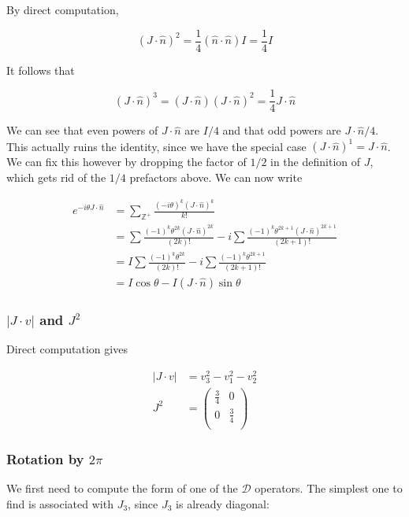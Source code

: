 \documentclass[12pt]{article}
\begin{document}
By direct computation,

\[ (J \cdot \hat{n})^2 = \frac{1}{4}(\hat{n}\cdot\hat{n})I = \frac{1}{4}I
\]

It follows that

\[ (J \cdot \hat{n})^3 = (J \cdot \hat{n})(J \cdot \hat{n})^2 = \frac{1}{4}J \cdot \hat{n}
\]

We can see that even powers of \(J\cdot\hat{n}\) are \(I/4\) and that odd powers are \(J\cdot\hat{n}/4\). This actually ruins the identity, since we have the special case \((J\cdot\hat{n})^1=J\cdot\hat{n}\). We can fix this however by dropping the factor of \(1/2\) in the definition of \(J\), which gets rid of the \(1/4\) prefactors above. We can now write

\begin{align*}
e^{-i\theta J \cdot \hat{n}} &= \sum_\mathbb{Z^+} \frac{(-i\theta)^k (J\cdot\hat{n})^k}{k!} \\
&= \sum \frac{(-1)^k\theta^{2k}(J\cdot\hat{n})^{2k}}{(2k)!} - i\sum \frac{(-1)^k\theta^{2k+1}( J\cdot\hat{n})^{2k+1}}{(2k+1)!} \\
&= I\sum \frac{(-1)^k\theta^{2k}}{(2k)!} - i\sum \frac{(-1)^k\theta^{2k+1}}{(2k+1)!} \\
&= I\cos\theta - I(J\cdot\hat{n})\sin\theta
\end{align*}

\subsubsection*{\(|J\cdot v|\) and \(J^2\)}

Direct computation gives

\begin{align*}
|J\cdot v| &= v_3^2 - v_1^2 - v_2^2 \\[6pt]
J^2 &= \left(
\begin{array}{cc}
 \frac{3}{4} & 0 \\
 0 & \frac{3}{4} \\
\end{array}
\right)
\end{align*}

\subsubsection*{Rotation by \(2\pi\)}

We first need to compute the form of one of the \( \mathscr{D} \) operators. The simplest one to find is associated with \(J_3\), since \(J_3\) is already diagonal:
\end{document}
